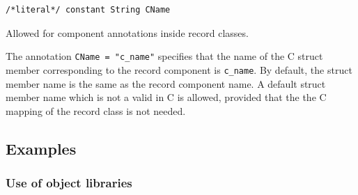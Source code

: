 \begin{annotationdefinition}[CName]
\begin{synopsis}\begin{lstlisting}
/*literal*/ constant String CName
\end{lstlisting}\end{synopsis}
\begin{semantics}
Allowed for component annotations inside record classes.

The annotation \lstinline!CName = "c_name"! specifies that the name of the C struct member corresponding to the record component is \lstinline[language=C]!c_name!.
By default, the struct member name is the same as the record component name.
A default struct member name which is not a valid in C is allowed, provided that the the C mapping of the record class is not needed.
\end{semantics}
\end{annotationdefinition}


\subsection{Examples}

\subsubsection{Use of object libraries}

